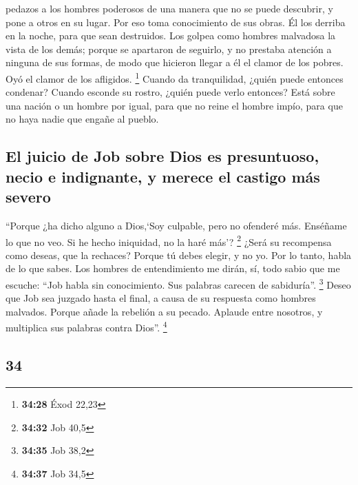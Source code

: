 \begin{paracol}{2}
pedazos a los hombres poderosos de una manera que no se puede descubrir,
y pone a otros en su lugar.  Por eso toma conocimiento de
sus obras. Él los derriba en la noche, para que sean destruidos.
 Los golpea como hombres malvadosa la vista de los demás;
 porque se apartaron de seguirlo, y no prestaba atención
a ninguna de sus formas,  de modo que hicieron llegar a
él el clamor de los pobres. Oyó el clamor de los afligidos. \footnote{\textbf{34:28}
  Éxod 22,23}  Cuando da tranquilidad, ¿quién puede
entonces condenar? Cuando esconde su rostro, ¿quién puede verlo
entonces? Está sobre una nación o un hombre por igual, 
para que no reine el hombre impío, para que no haya nadie que engañe al
pueblo.

\hypertarget{el-juicio-de-job-sobre-dios-es-presuntuoso-necio-e-indignante-y-merece-el-castigo-muxe1s-severo}{%
\subsection{El juicio de Job sobre Dios es presuntuoso, necio e
indignante, y merece el castigo más
severo}\label{el-juicio-de-job-sobre-dios-es-presuntuoso-necio-e-indignante-y-merece-el-castigo-muxe1s-severo}}

 ``Porque ¿ha dicho alguno a Dios,`Soy culpable, pero no
ofenderé más.  Enséñame lo que no veo. Si he hecho
iniquidad, no la haré más'? \footnote{\textbf{34:32} Job 40,5}
 ¿Será su recompensa como deseas, que la rechaces? Porque
tú debes elegir, y no yo. Por lo tanto, habla de lo que sabes.
 Los hombres de entendimiento me dirán, sí, todo sabio
que me escuche:  ``Job habla sin conocimiento. Sus
palabras carecen de sabiduría''. \footnote{\textbf{34:35} Job 38,2}
 Deseo que Job sea juzgado hasta el final, a causa de su
respuesta como hombres malvados.  Porque añade la
rebelión a su pecado. Aplaude entre nosotros, y multiplica sus palabras
contra Dios''. \footnote{\textbf{34:37} Job 34,5}

\switchcolumn
\begin{otherlanguage}{english}

\hypertarget{section-67}{%
\section{34}\label{section-67}}


\end{otherlanguage}
\end{paracol}
